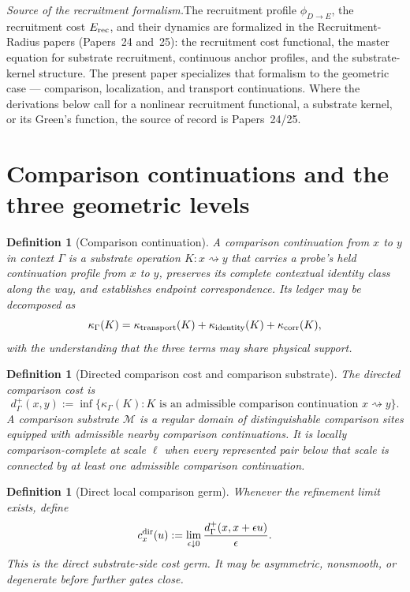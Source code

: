 \documentclass[11pt]{article}
\newtheorem{definition}[theorem]{Definition}
\theoremstyle{remark}
\newcommand{\G}{\Gamma}
\newcommand{\goes}{\rightsquigarrow}
\newcommand{\Cost}{\kappa}
\newcommand{\Erec}{E_{\rm rec}}
\newcommand{\phide}{\phi_{D\to E}}
\newcommand{\Mgeom}{\mathcal M}
\begin{document}
\noindent\textit{Source of the recruitment formalism.}\quad The recruitment profile $\phide$, the recruitment cost $\Erec$, and their dynamics are formalized in the Recruitment-Radius papers (Papers~24 and~25): the recruitment cost functional, the master equation for substrate recruitment, continuous anchor profiles, and the substrate-kernel structure.  The present paper specializes that formalism to the geometric case --- comparison, localization, and transport continuations.  Where the derivations below call for a nonlinear recruitment functional, a substrate kernel, or its Green's function, the source of record is Papers~24/25.

\section{Comparison continuations and the three geometric levels}
\label{sec:three-geometries}

\begin{definition}[Comparison continuation]
A comparison continuation from $x$ to $y$ in context $\G$ is a substrate operation $K:x\goes y$ that carries a probe's held continuation profile from $x$ to $y$, preserves its complete contextual identity class along the way, and establishes endpoint correspondence.  Its ledger may be decomposed as
\[
\Cost_\G(K)
=
\Cost_{\rm transport}(K)
+
\Cost_{\rm identity}(K)
+
\Cost_{\rm corr}(K),
\]
with the understanding that the three terms may share physical support.
\end{definition}

\begin{definition}[Directed comparison cost and comparison substrate]
The directed comparison cost is
\[
        d^+_\G(x,y)
        :=
        \inf\{\Cost_\G(K):K\text{ is an admissible comparison continuation }x\goes y\}.
\]
A comparison substrate $\Mgeom$ is a regular domain of distinguishable comparison sites equipped with admissible nearby comparison continuations.  It is locally comparison-complete at scale $\ell$ when every represented pair below that scale is connected by at least one admissible comparison continuation.
\end{definition}

\begin{definition}[Direct local comparison germ]
Whenever the refinement limit exists, define
\[
        c_x^{\rm dir}(u)
        :=
        \lim_{\epsilon\downarrow0}
        \frac{d^+_\G(x,x+\epsilon u)}{\epsilon}.
\]
This is the direct substrate-side cost germ.  It may be asymmetric, nonsmooth, or degenerate before further gates close.
\end{definition}
\end{document}

